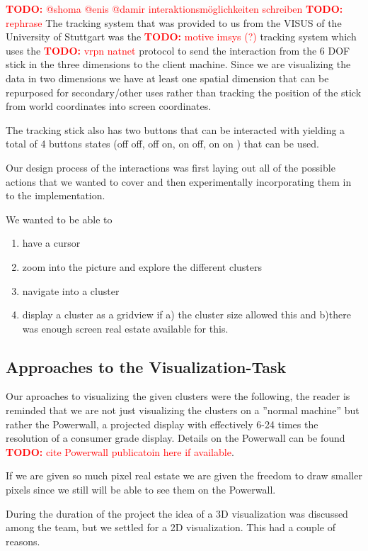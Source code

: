 \documentclass[journal]{vgtc}       %
\newcommand{\todo}[1]{\textcolor{red}{\textbf{TODO:} #1}}
\begin{document}
\todo{@shoma @enis @damir interaktionsmöglichkeiten schreiben}
\todo{rephrase}
The tracking system that was provided to us from the VISUS of the University of Stuttgart was the \todo{motive imsys (?)} tracking system which uses the \todo{vrpn natnet} protocol to send the interaction from the 6 DOF stick in the three dimensions to the client machine. 
Since we are visualizing the data in two dimensions we have at least one spatial dimension that can be repurposed for secondary/other uses rather than tracking the position of the stick from world coordinates into screen coordinates.

The tracking stick also has two buttons that can be interacted with yielding a total of 4 buttons states (off off, off on, on off, on on ) that can be used.

Our design process of the interactions was first  laying out all of the possible actions that we wanted to cover and then experimentally incorporating them in to the implementation.

We wanted to be able to 
\begin{enumerate}
  \item have a cursor 
  \item zoom into the picture and  explore the different clusters
  \item navigate into a cluster
  \item display a cluster as a gridview if a) the cluster size allowed this and b)there was enough screen real estate available for this.
  
\end{enumerate}
\subsection{Approaches to the Visualization-Task}

Our aproaches to visualizing the given clusters were the following, the reader is reminded that we are not just visualizing the clusters on a ''normal machine'' but rather the Powerwall, a projected display with effectively 6-24 times the resolution of a consumer grade display. Details on the Powerwall can be found \todo{cite Powerwall publicatoin here if available}. \cite{Powerwall}

If we are given so much pixel real estate we are given the freedom to draw smaller pixels since we still will be able to see them on the Powerwall.

During the duration of the project the idea of a 3D visualization was discussed among the team, but we settled for a 2D visualization. This had a couple of reasons.
\end{document}
